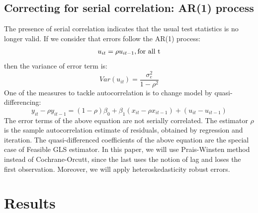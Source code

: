 \documentclass[titlepage, 11pt]{article}
\begin{document}
\subsection{Correcting for serial correlation: AR(1) process}
The presence of serial correlation indicates that the usual test statistics is no longer valid\cite{book}. If we consider that errors follow the AR(1) process: 
\begin{equation}
u_{it} = \rho u_{it-1}, \textnormal{for all t} 
\end{equation}
then the variance of error term is: 
\begin{equation}
Var(u_{it})= \frac{\sigma_e^2}{1-\rho^2}
\end{equation}
One of the measures to tackle autocorrelation is to change model by quasi-differencing: 
\begin{equation}
y_{it} - \rho y_{it-1}= (1-\rho)\beta_0 + \beta_1(x_{it}-\rho x_{it-1}) + (u_{it}-u_{it-1}) 
\end{equation}
The error terms of the above equation are not serially correlated. The estimator $\rho$ is the sample autocorrelation estimate of residuals, obtained by regression and iteration. The quasi-differenced coefficients of the above equation are the special case of Feasible GLS estimator. In this paper, we will use Prais-Winsten method instead of Cochrane-Orcutt, since the last uses the notion of lag and loses the first observation. Moreover, we will apply heteroskedasticity robust errors. 

\section{Results}
\end{document}
